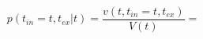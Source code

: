\begin{equation}
p(t_{in}=t,t_{ex}|t)  = \frac{v(t,t_{in}=t,t_{ex})}{V(t)}=
\end{equation}\begin{equation}

\end{equation}
